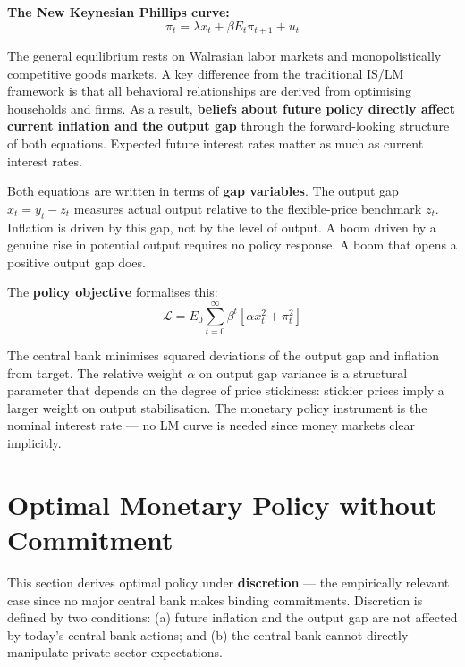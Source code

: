 \documentclass[11pt, a4paper]{article}
\begin{document}
\textbf{The New Keynesian Phillips curve:}
\begin{equation}
    \pi_t = \lambda x_t + \beta E_t\pi_{t+1} + u_t
\end{equation}

The general equilibrium rests on Walrasian labor markets and monopolistically
competitive goods markets. A key difference from the traditional IS/LM
framework is that all behavioral relationships are derived from optimising
households and firms. As a result, \textbf{beliefs about future policy
directly affect current inflation and the output gap} through the
forward-looking structure of both equations. Expected future interest rates
matter as much as current interest rates.

Both equations are written in terms of \textbf{gap variables}. The output
gap $x_t = y_t - z_t$ measures actual output relative to the flexible-price
benchmark $z_t$. Inflation is driven by this gap, not by the level of output.
A boom driven by a genuine rise in potential output requires no policy
response. A boom that opens a positive output gap does.

The \textbf{policy objective} formalises this:
\begin{equation}
    \mathcal{L} = E_0 \sum_{t=0}^{\infty} \beta^t
    \left[\alpha x_t^2 + \pi_t^2\right]
\end{equation}

The central bank minimises squared deviations of the output gap and inflation
from target. The relative weight $\alpha$ on output gap variance is a
structural parameter that depends on the degree of price stickiness: stickier
prices imply a larger weight on output stabilisation. The monetary policy
instrument is the nominal interest rate --- no LM curve is needed since money
markets clear implicitly.

\section{Optimal Monetary Policy without Commitment}\label{sec:discretion}

This section derives optimal policy under \textbf{discretion} --- the
empirically relevant case since no major central bank makes binding
commitments. Discretion is defined by two conditions: (a) future inflation
and the output gap are not affected by today's central bank actions; and (b)
the central bank cannot directly manipulate private sector expectations.
\end{document}
